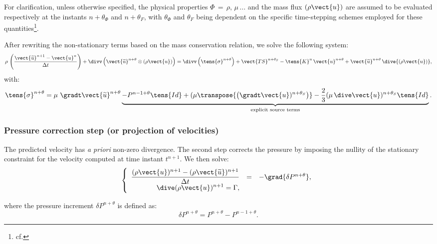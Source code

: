 For clarification, unless otherwise specified, the physical properties
$\Phi\,=\,\rho,\,\mu\,...$ and the mass flux $(\rho\vect{u})$ are assumed
to be evaluated respectively at the instants $n+\theta_\Phi$ and
$n+\theta_F$, with $\theta_\Phi$ and $\theta_F$ being dependent on the
specific time-stepping schemes employed for these
quantities\footnote{cf. }.

After rewriting the non-stationary terms based on the mass conservation relation,
we solve the following system:
\begin{equation}
\displaystyle
\rho\,\left(\dfrac{\vect{\widetilde{u}}^{n+1}-\vect {u}^{n}}{\Delta t}\right) +
\divv \left(\vect{\widetilde{u}}^{n+\theta} \otimes (\rho\vect{u}) \right) =
\divv \left(\tens{\sigma}^{n+\theta}\right) + \vect{TS}^{n+\theta_{S}}-\tens{K}^{n}\,\vect{u}^{n+\theta} +\vect{\widetilde{u}}^{n+\theta}\,\dive{(\rho\vect{u})} ,
\label{eq:navstv:c0_prediction_step}
\end{equation}
with:
\begin{equation}
\displaystyle
\tens{\sigma}^{n+\theta}=\mu\,\,\gradt\vect{\widetilde{u}}^{n+\theta}\underbrace{-P^{n-1+\theta}\tens{Id}+ (\mu \transpose{ \left(\gradt\vect{u})^{n+\theta_{S}}\right)}- \frac{2}{3} ( \mu\, \dive \vect{u})^{n+\theta_{S}}\tens{Id}}_{\text{explicit source terms}}.
\end{equation}

\subsubsection*{\bf Pressure correction step (or projection of velocities)}
The predicted velocity has \emph{a priori} non-zero divergence. The second step
corrects the pressure by imposing the nullity of the stationary constraint for
the velocity computed at time instant ${t^{n+1}}$.
We then solve:
\begin{equation}\label{eq:navstv:c0_correction_step}
\left\{\begin{array}{ r c l}
\displaystyle \dfrac{(\rho\vect{u})^{n+1}-(\rho\vect{\widetilde{u}})^{n+1}}{\Delta t} &=&
-\grad{\delta P^{n+\theta}} ,\\
\displaystyle
\dive(\rho\vect{u})^{n+1} = \Gamma ,\\
\end{array}\right.
\end{equation}

where the pressure increment $\delta P^{n+\theta}$ is defined as:
\begin{equation}
\delta P^{n+\theta}=P^{n+\theta}-P^{n-1+\theta} .
\end{equation}

